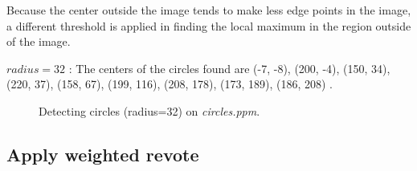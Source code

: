 \documentclass[paper=a4, fontsize=11pt]{scrartcl}
\numberwithin{equation}{section}		%
\numberwithin{figure}{section}			%
\begin{document}
Because the center outside the image tends to make less edge points in the image, a different threshold is applied in finding the local maximum in the region outside of the image.

$ radius = 32 $ : The centers of the circles found are (-7, -8), (200, -4), (150, 34), (220, 37), (158, 67), (199, 116), (208, 178), (173, 189), (186, 208) .

\begin{figure}[h]
\centering
{}
\caption{Detecting circles (radius=32) on \emph{circles.ppm}.}
\label{fig:hough:circle:32:cv}
\end{figure}

\subsection{Apply weighted revote}
\end{document}
